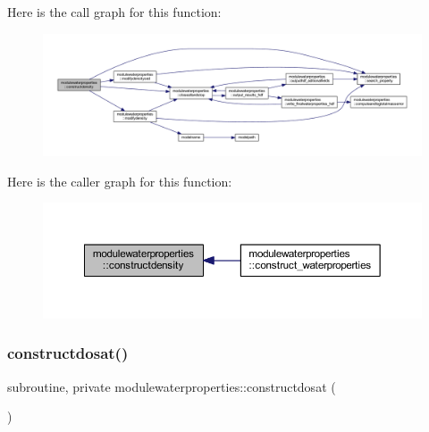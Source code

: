 Here is the call graph for this function\+:\nopagebreak
\begin{figure}[H]
\begin{center}
\leavevmode
\includegraphics[width=350pt]{namespacemodulewaterproperties_aa61935dbc55b8114ffeef13972cd62b1_cgraph}
\end{center}
\end{figure}
Here is the caller graph for this function\+:\nopagebreak
\begin{figure}[H]
\begin{center}
\leavevmode
\includegraphics[width=350pt]{namespacemodulewaterproperties_aa61935dbc55b8114ffeef13972cd62b1_icgraph}
\end{center}
\end{figure}
\mbox{\label{namespacemodulewaterproperties_ad828152e0a7f6fd60ca0cd045955a56b}} 
\subsubsection{\texorpdfstring{constructdosat()}{constructdosat()}}
{\footnotesize\ttfamily subroutine, private modulewaterproperties\+::constructdosat (\begin{DoxyParamCaption}{ }\end{DoxyParamCaption})\hspace{0.3cm}{\ttfamily [private]}}

